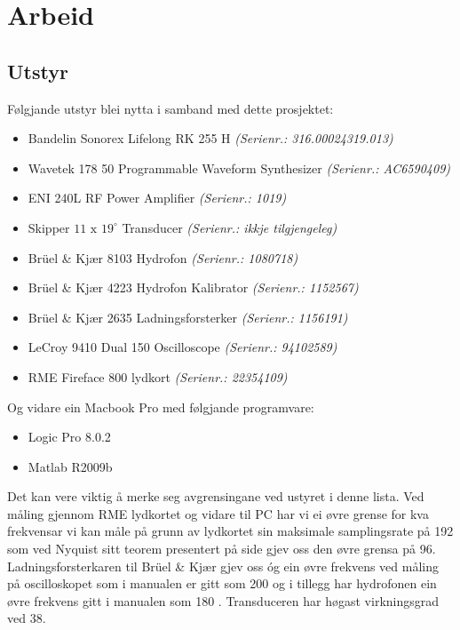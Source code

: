 \section{Arbeid}
\subsection{Utstyr}
Følgjande utstyr blei nytta i samband med dette prosjektet:
\begin{itemize}
	\item Bandelin Sonorex Lifelong RK 255 H \textit{(Serienr.: 316.00024319.013)}
	\item Wavetek 178 \unit{50}{\mega\hertz} Programmable Waveform Synthesizer \textit{(Serienr.: AC6590409)}
	\item ENI 240L RF Power Amplifier \textit{(Serienr.: 1019)}
	\item Skipper $11\text{ x }{19}^\circ$ Transducer \textit{(Serienr.: ikkje tilgjengeleg)}
	\item Brüel \& Kjær 8103 Hydrofon \textit{(Serienr.: 1080718)}
	\item Brüel \& Kjær 4223 Hydrofon Kalibrator \textit{(Serienr.: 1152567)}
	\item Brüel \& Kjær 2635 Ladningsforsterker \textit{(Serienr.: 1156191)}
	\item LeCroy 9410 Dual \unit{150}{\mega\hertz} Oscilloscope \textit{(Serienr.: 94102589)}
	\item RME Fireface 800 lydkort \textit{(Serienr.: 22354109)}
\end{itemize}

Og vidare ein Macbook Pro med følgjande programvare:

\begin{itemize}
	\item Logic Pro 8.0.2
	\item Matlab R2009b
\end{itemize}

Det kan vere viktig å merke seg avgrensingane ved ustyret i denne lista. Ved måling gjennom RME lydkortet og vidare til PC har vi ei øvre grense for kva frekvensar vi kan måle på grunn av lydkortet sin maksimale samplingsrate på \unit{192}{\kilo\hertz} som ved Nyquist sitt teorem presentert på side \pageref{nyquist} gjev oss den øvre grensa på \unit{96}{\kilo\hertz}. Ladningsforsterkaren til Brüel \& Kjær gjev oss óg ein øvre frekvens ved måling på oscilloskopet som i manualen er gitt som \unit{200}{\kilo\hertz} \cite{ladnforsterker} og i tillegg har hydrofonen ein øvre frekvens gitt i manualen som \unit{180}{\kilo\hertz} \cite{hydrofon}. Transduceren har høgast virkningsgrad ved \unit{38}{\kilo\hertz}. 

